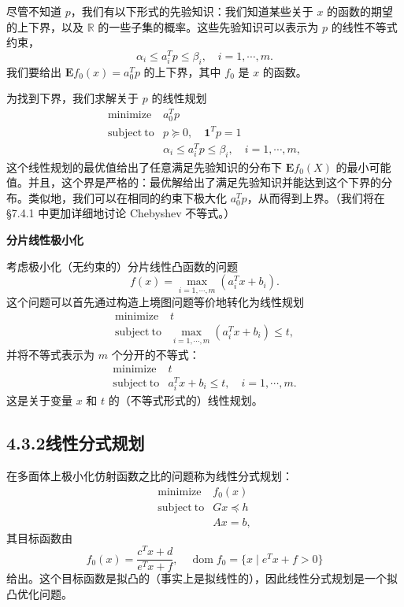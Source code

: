 \documentclass[UTF8,12pt,a4paper,fontset=fandol]{ctexart}
\begin{document}
尽管不知道 $p$，我们有以下形式的先验知识：我们知道某些关于 $x$ 的函数的期望的上下界，以及 $\mathbb{R}$ 的一些子集的概率。这些先验知识可以表示为 $p$ 的线性不等式约束，
\[
\alpha_i\leq a_i^Tp\leq \beta_i,\quad i=1,\cdots,m.
\]
我们要给出 $\mathbf{E}f_0(x)=a_0^Tp$ 的上下界，其中 $f_0$ 是 $x$ 的函数。

为找到下界，我们求解关于 $p$ 的线性规划
\[
\begin{array}{ll}
\mathop{\mathrm{minimize}} & a_0^Tp\\
\mathrm{subject\ to} & p\succeq 0,\quad \mathbf{1}^Tp=1\\
& \alpha_i\leq a_i^Tp\leq \beta_i,\quad i=1,\cdots,m,
\end{array}
\]
这个线性规划的最优值给出了任意满足先验知识的分布下 $\mathbf{E}f_0(X)$ 的最小可能值。并且，这个界是严格的：最优解给出了满足先验知识并能达到这个下界的分布。类似地，我们可以在相同的约束下极大化 $a_0^Tp$，从而得到上界。（我们将在 §7.4.1 中更加详细地讨论 Chebyshev 不等式。）

\noindent\textbf{分片线性极小化}

考虑极小化（无约束的）分片线性凸函数的问题
\[
f(x)=\max_{i=1,\cdots,m}(a_i^Tx+b_i).
\]
这个问题可以首先通过构造上境图问题等价地转化为线性规划
\[
\begin{array}{ll}
\mathop{\mathrm{minimize}} & t\\
\mathrm{subject\ to} & \max_{i=1,\cdots,m}(a_i^Tx+b_i)\leq t,
\end{array}
\]
并将不等式表示为 $m$ 个分开的不等式：
\[
\begin{array}{ll}
\mathop{\mathrm{minimize}} & t\\
\mathrm{subject\ to} & a_i^Tx+b_i\leq t,\quad i=1,\cdots,m.
\end{array}
\]
这是关于变量 $x$ 和 $t$ 的（不等式形式的）线性规划。

\subsection*{4.3.2\quad 线性分式规划}

在多面体上极小化仿射函数之比的问题称为线性分式规划：
\begin{equation}
\begin{array}{ll}
\mathop{\mathrm{minimize}} & f_0(x)\\
\mathrm{subject\ to} & Gx\preceq h\\
& Ax=b,
\end{array}
\tag{4.32}
\end{equation}
其目标函数由
\[
f_0(x)=\frac{c^Tx+d}{e^Tx+f},\quad
\operatorname{dom} f_0=\{x\mid e^Tx+f>0\}
\]
给出。这个目标函数是拟凸的（事实上是拟线性的），因此线性分式规划是一个拟凸优化问题。
\end{document}
